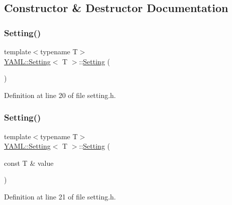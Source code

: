 \subsection{Constructor \& Destructor Documentation}
\mbox{\label{class_y_a_m_l_1_1_setting_ace58792f00f4106cf1f1abd21ca1591b}} 
\subsubsection{\texorpdfstring{Setting()}{Setting()}\hspace{0.1cm}{\footnotesize\ttfamily [1/2]}}
{\footnotesize\ttfamily template$<$typename T$>$ \\
\mbox{\hyperlink{class_y_a_m_l_1_1_setting}{Y\+A\+M\+L\+::\+Setting}}$<$ T $>$\+::\mbox{\hyperlink{class_y_a_m_l_1_1_setting}{Setting}} (\begin{DoxyParamCaption}{ }\end{DoxyParamCaption})\hspace{0.3cm}{\ttfamily [inline]}}



Definition at line 20 of file setting.\+h.

\mbox{\label{class_y_a_m_l_1_1_setting_aa189661e44391066a6b09bcb2f00676c}} 
\subsubsection{\texorpdfstring{Setting()}{Setting()}\hspace{0.1cm}{\footnotesize\ttfamily [2/2]}}
{\footnotesize\ttfamily template$<$typename T$>$ \\
\mbox{\hyperlink{class_y_a_m_l_1_1_setting}{Y\+A\+M\+L\+::\+Setting}}$<$ T $>$\+::\mbox{\hyperlink{class_y_a_m_l_1_1_setting}{Setting}} (\begin{DoxyParamCaption}\item[{const T \&}]{value }\end{DoxyParamCaption})\hspace{0.3cm}{\ttfamily [inline]}}



Definition at line 21 of file setting.\+h.



